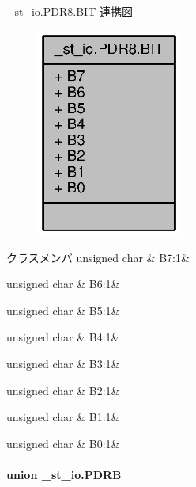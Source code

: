 \+\_\+st\+\_\+io.\+P\+D\+R8.\+B\+I\+T 連携図
\nopagebreak
\begin{figure}[H]
\begin{center}
\leavevmode
\includegraphics[width=135pt]{de/d37/struct__st__io_8PDR8_8BIT__coll__graph}
\end{center}
\end{figure}
\begin{DoxyFields}{クラスメンバ}
unsigned char\label{3694s_8h_ad8498108dd603522047564a8da7be94c}
&
B7\+:1&
\\
\hline

unsigned char\label{3694s_8h_a68b1f1cc15d8987eafe633c9488bdc05}
&
B6\+:1&
\\
\hline

unsigned char\label{3694s_8h_a2a1ab298edf0162a3305e599b47cbeee}
&
B5\+:1&
\\
\hline

unsigned char\label{3694s_8h_ad5d4cc7b09d1843517acc9361f8f665e}
&
B4\+:1&
\\
\hline

unsigned char\label{3694s_8h_a0c4ecd7b59ebc5b9f47974cb9845fd02}
&
B3\+:1&
\\
\hline

unsigned char\label{3694s_8h_abbd97b00c539801e32317ab550867ec4}
&
B2\+:1&
\\
\hline

unsigned char\label{3694s_8h_ac9512565ef6194ca664dc41ec0de7a53}
&
B1\+:1&
\\
\hline

unsigned char\label{3694s_8h_a4c769c2c9989abb9fa024ab9930270e5}
&
B0\+:1&
\\
\hline

\end{DoxyFields}
\label{union__st__io_8PDRB}
\paragraph{union \+\_\+st\+\_\+io.\+P\+D\+R\+B}


